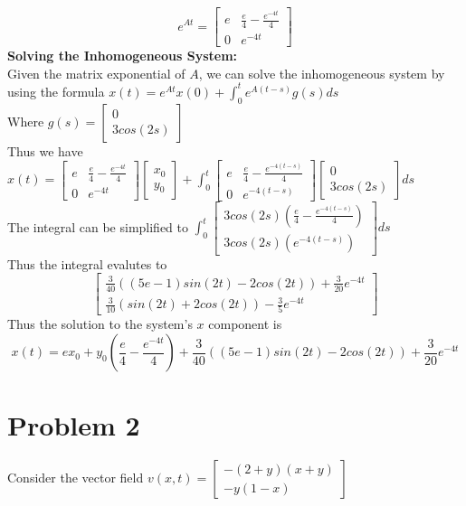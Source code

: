 \documentclass{article}
\begin{document}
$$ e^{At} = \begin{bmatrix}
    e & \frac{e}{4} - \frac{e^{-4t}}{4}\\
    0 & e^{-4t}
\end{bmatrix}$$
\textbf{Solving the Inhomogeneous System:}\\
Given the matrix exponential of $A$, we can solve the inhomogeneous system by using the formula $x(t) = e^{At}x(0) + \int_0^t e^{A(t - s)}g(s)ds$\\
Where $g(s) = \begin{bmatrix}
    0\\
    3cos(2s)
\end{bmatrix}$\\
Thus we have $x(t) = \begin{bmatrix}
    e & \frac{e}{4} - \frac{e^{-4t}}{4}\\
    0 & e^{-4t}
\end{bmatrix}\begin{bmatrix}
    x_0\\
    y_0
\end{bmatrix} + \int_0^t \begin{bmatrix}
    e & \frac{e}{4} - \frac{e^{-4(t - s)}}{4}\\
    0 & e^{-4(t - s)}
\end{bmatrix}\begin{bmatrix}
    0\\
    3cos(2s)
\end{bmatrix}ds$\\
The integral can be simplified to $\int_0^t \begin{bmatrix}
    3cos(2s) (\frac{e}{4} - \frac{e^{-4(t - s)}}{4})\\
    3cos(2s) (e^{-4(t - s)})
\end{bmatrix}ds$\\
Thus the integral evalutes to 
$$\begin{bmatrix}
    \frac{3}{40}((5e-1)sin(2t) - 2cos(2t)) + \frac{3}{20}e^{-4t}\\
    \frac{3}{10}(sin(2t) +2cos(2t))- \frac{3}{5}e^{-4t}
\end{bmatrix}$$
Thus the solution to the system's $x$ component is 
$$x(t) = ex_0 + y_0(\frac{e}{4}-\frac{e^{-4t}}{4}) + \frac{3}{40}((5e-1)sin(2t) - 2cos(2t)) + \frac{3}{20}e^{-4t}$$

\section*{Problem 2}
Consider the vector field $v(x,t) = \begin{bmatrix}
    -(2+y)(x+y)\\
    -y(1-x)
\end{bmatrix}$\\
\end{document}
